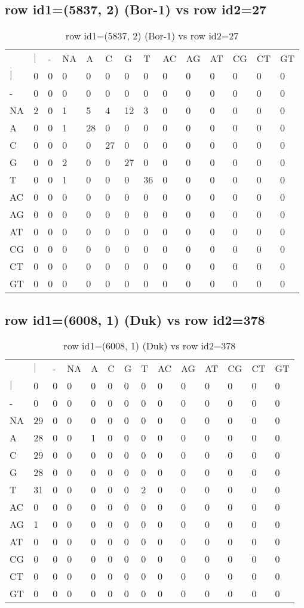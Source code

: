 \subsection{row id1=(5837, 2) (Bor-1) vs row id2=27}
\begin{center}
\begin{longtable}{|l|l|l|l|l|l|l|l|l|l|l|l|l|l|}
\caption{row id1=(5837, 2) (Bor-1) vs row id2=27} \label{table_dm4}\\
\hline
\\
\hline
&$|$&-&NA&A&C&G&T&AC&AG&AT&CG&CT&GT\\
$|$&0&0&0&0&0&0&0&0&0&0&0&0&0\\
-&0&0&0&0&0&0&0&0&0&0&0&0&0\\
NA&2&0&1&5&4&12&3&0&0&0&0&0&0\\
A&0&0&1&28&0&0&0&0&0&0&0&0&0\\
C&0&0&0&0&27&0&0&0&0&0&0&0&0\\
G&0&0&2&0&0&27&0&0&0&0&0&0&0\\
T&0&0&1&0&0&0&36&0&0&0&0&0&0\\
AC&0&0&0&0&0&0&0&0&0&0&0&0&0\\
AG&0&0&0&0&0&0&0&0&0&0&0&0&0\\
AT&0&0&0&0&0&0&0&0&0&0&0&0&0\\
CG&0&0&0&0&0&0&0&0&0&0&0&0&0\\
CT&0&0&0&0&0&0&0&0&0&0&0&0&0\\
GT&0&0&0&0&0&0&0&0&0&0&0&0&0\\
\hline
\end{longtable}
\end{center}

\subsection{row id1=(6008, 1) (Duk) vs row id2=378}
\begin{center}
\begin{longtable}{|l|l|l|l|l|l|l|l|l|l|l|l|l|l|}
\caption{row id1=(6008, 1) (Duk) vs row id2=378} \label{table_dm6}\\
\hline
\\
\hline
&$|$&-&NA&A&C&G&T&AC&AG&AT&CG&CT&GT\\
$|$&0&0&0&0&0&0&0&0&0&0&0&0&0\\
-&0&0&0&0&0&0&0&0&0&0&0&0&0\\
NA&29&0&0&0&0&0&0&0&0&0&0&0&0\\
A&28&0&0&1&0&0&0&0&0&0&0&0&0\\
C&29&0&0&0&0&0&0&0&0&0&0&0&0\\
G&28&0&0&0&0&0&0&0&0&0&0&0&0\\
T&31&0&0&0&0&0&2&0&0&0&0&0&0\\
AC&0&0&0&0&0&0&0&0&0&0&0&0&0\\
AG&1&0&0&0&0&0&0&0&0&0&0&0&0\\
AT&0&0&0&0&0&0&0&0&0&0&0&0&0\\
CG&0&0&0&0&0&0&0&0&0&0&0&0&0\\
CT&0&0&0&0&0&0&0&0&0&0&0&0&0\\
GT&0&0&0&0&0&0&0&0&0&0&0&0&0\\
\hline
\end{longtable}
\end{center}


